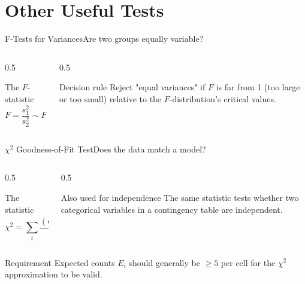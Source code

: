 \documentclass[aspectratio=169,11pt]{beamer}
\begin{document}
\section{Other Useful Tests}

\begin{frame}{F-Tests for Variances}{Are two groups equally variable?}
  \begin{columns}[T]
    \begin{column}{0.5\textwidth}
      \begin{block}{The $F$-statistic}
        \[ F = \frac{s_1^2}{s_2^2} \sim F_{n_1-1,\,n_2-1} \]
      \end{block}
    \end{column}
    \begin{column}{0.5\textwidth}
      \begin{exampleblock}{Decision rule}
        \small Reject "equal variances" if $F$ is far from 1 (too large or
        too small) relative to the $F$-distribution's critical values.
      \end{exampleblock}
    \end{column}
  \end{columns}
\end{frame}

\begin{frame}{$\chi^2$ Goodness-of-Fit Test}{Does the data match a model?}
  \begin{columns}[T]
    \begin{column}{0.5\textwidth}
      \begin{block}{The statistic}
        \[ \chi^2 = \sum_{i} \frac{(O_i - E_i)^2}{E_i} \]
      \end{block}
    \end{column}
    \begin{column}{0.5\textwidth}
      \begin{exampleblock}{Also used for independence}
        \small The same statistic tests whether two categorical variables
        in a contingency table are independent.
      \end{exampleblock}
    \end{column}
  \end{columns}
  \begin{alertblock}{Requirement}
    \small Expected counts $E_i$ should generally be $\ge 5$ per cell for
    the $\chi^2$ approximation to be valid.
  \end{alertblock}
\end{frame}
\end{document}
